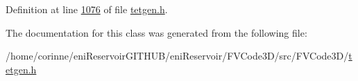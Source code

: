 Definition at line \hyperlink{tetgen_8h_source_l01076}{1076} of file \hyperlink{tetgen_8h_source}{tetgen.\+h}.



The documentation for this class was generated from the following file\+:\begin{DoxyCompactItemize}
\item 
/home/corinne/eni\+Reservoir\+G\+I\+T\+H\+U\+B/eni\+Reservoir/\+F\+V\+Code3\+D/src/\+F\+V\+Code3\+D/\hyperlink{tetgen_8h}{tetgen.\+h}\end{DoxyCompactItemize}
